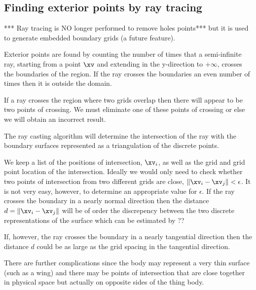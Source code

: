 \subsection{Finding exterior points by ray tracing}

*** Ray tracing is NO longer performed to remove holes points*** but it is used to
generate embedded boundary grids (a future feature).


Exterior points are found by counting the number of times that a semi-infinite ray,
starting from a point $\xv$ and extending in the y-direction to $+\infty$, crosses
the boundaries of the region.  If the ray crosses the boundaries an even number of times then it
is outside the domain.

If a ray crosses the region where two grids overlap then there will appear
to be two points of crossing. We must eliminate one of these points of
crossing or else we will obtain an incorrect result. 

The ray casting algorithm will determine the intersection of the ray with the boundary
surfaces represented as a triangulation of the discrete points.

We keep a list of the positions of intersection, $\xv_i$, as well as the grid and grid
point location of the intersection. Ideally we would only need to check whether two points
of intersection from two different grids are close, $\| \xv_i - \xv_j \| < \epsilon$.
It is not very easy, however, to determine an appropriate value for $\epsilon$. 
If the ray crosses the boundary in a nearly normal direction then the distance $d=\| \xv_i - \xv_j \|$
will be of order the discrepency between the two discrete representations of the surface which
can be estimated by ??

If, however, the ray
crosses the boundary in a nearly tangential direction then the distance $d$
could be as large as the grid spacing in the tangential direction.

There are further complications since the body may represent a very thin surface (such as a wing)
and there may be points of intersection that are close together in physical space 
but actually on opposite sides of the thing body. 

% 

